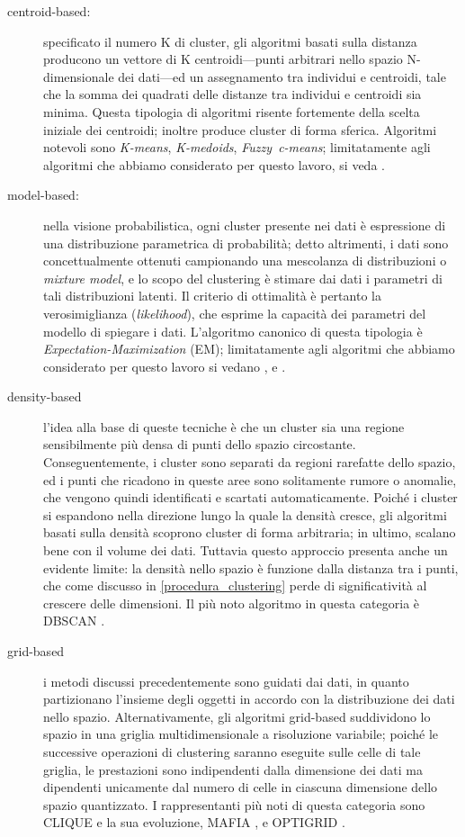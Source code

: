 \begin{description}
\item[centroid-based:] specificato il numero K di cluster, gli algoritmi basati sulla distanza producono un vettore di K centroidi---punti arbitrari nello spazio N-dimensionale dei dati---ed un assegnamento tra individui e centroidi, tale che la somma dei quadrati delle distanze tra individui e centroidi sia minima. Questa tipologia di algoritmi risente fortemente della scelta iniziale dei centroidi; inoltre produce cluster di forma sferica. Algoritmi notevoli sono \mbox{\textit{K-means}}, \mbox{\textit{K-medoids}}, \mbox{\textit{Fuzzy c-means}}; limitatamente agli algoritmi che abbiamo considerato per questo lavoro, si veda \cite{lac}.
\item[model-based:] nella visione probabilistica, ogni cluster presente nei dati \`e espressione di una distribuzione parametrica di probabilit\`a; detto altrimenti, i dati sono concettualmente ottenuti campionando una mescolanza di distribuzioni o \textit{mixture model}, e lo scopo del clustering \`e stimare dai dati i parametri di tali distribuzioni latenti. Il criterio di ottimalit\`a \`e pertanto la verosimiglianza (\textit{likelihood}), che esprime la capacit\`a dei parametri del modello di spiegare i dati. L'algoritmo canonico di questa tipologia \`e \textit{Expectation-Maximization} (EM); limitatamente agli algoritmi che abbiamo considerato per questo lavoro si vedano \cite{moc}, \cite{cesna} e \cite{handcock07}.
\item[density-based] l'idea alla base di queste tecniche \`e che un cluster sia una regione sensibilmente pi\`u densa di punti dello spazio circostante. Conseguentemente, i cluster sono separati da regioni rarefatte dello spazio, ed i punti che ricadono in queste aree sono solitamente rumore o anomalie, che vengono quindi identificati e scartati automaticamente. Poich\'e i cluster si espandono nella direzione lungo la quale la densit\`a cresce, gli algoritmi basati sulla densit\`a scoprono cluster di forma arbitraria; in ultimo, scalano bene con il volume dei dati. Tuttavia questo approccio presenta anche un evidente limite: la densit\`a nello spazio \`e funzione dalla distanza tra i punti, che come discusso in \autoref{procedura_clustering} perde di significativit\`a al crescere delle dimensioni. Il pi\`u noto algoritmo in questa categoria \`e DBSCAN \cite{dbscan}.
\item[grid-based] i metodi discussi precedentemente sono guidati dai dati, in quanto partizionano l'insieme degli oggetti in accordo con la distribuzione dei dati nello spazio. Alternativamente, gli algoritmi grid-based suddividono lo spazio in una griglia multidimensionale a risoluzione variabile; poich\'e le successive operazioni di clustering saranno eseguite sulle celle di tale griglia, le prestazioni sono indipendenti dalla dimensione dei dati ma dipendenti unicamente dal numero di celle in ciascuna dimensione dello spazio quantizzato. I rappresentanti pi\`u noti di questa categoria sono CLIQUE \cite{clique} e la sua evoluzione, MAFIA \cite{mafia}, e OPTIGRID \cite{optigrid}.
\end{description}
